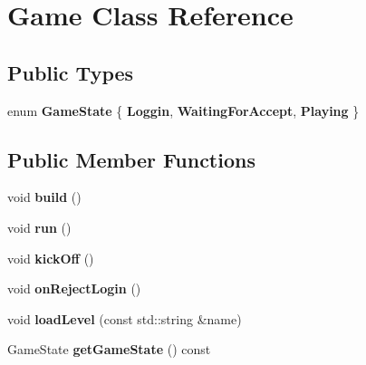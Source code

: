 \hypertarget{class_game}{\section{Game Class Reference}
\label{class_game}
}
\subsection*{Public Types}
\begin{DoxyCompactItemize}
\item 
enum {\bfseries Game\-State} \{ {\bfseries Loggin}, 
{\bfseries Waiting\-For\-Accept}, 
{\bfseries Playing}
 \}
\end{DoxyCompactItemize}
\subsection*{Public Member Functions}
\begin{DoxyCompactItemize}
\item 
\hypertarget{class_game_ab0f21e585b373e81baec2eb21679defe}{void {\bfseries build} ()}\label{class_game_ab0f21e585b373e81baec2eb21679defe}

\item 
\hypertarget{class_game_a1ab78f5ed0d5ea879157357cf2fb2afa}{void {\bfseries run} ()}\label{class_game_a1ab78f5ed0d5ea879157357cf2fb2afa}

\item 
\hypertarget{class_game_a92d26f09bb71012aa2dc3ec58e0656ef}{void {\bfseries kick\-Off} ()}\label{class_game_a92d26f09bb71012aa2dc3ec58e0656ef}

\item 
\hypertarget{class_game_a67a0885d0068caad4a306670120a64aa}{void {\bfseries on\-Reject\-Login} ()}\label{class_game_a67a0885d0068caad4a306670120a64aa}

\item 
\hypertarget{class_game_a9764aec80dddfe3be2842bbd05f1e5c7}{void {\bfseries load\-Level} (const std\-::string \&name)}\label{class_game_a9764aec80dddfe3be2842bbd05f1e5c7}

\item 
\hypertarget{class_game_ac9317693584f31dd51f12e0fa84a1233}{Game\-State {\bfseries get\-Game\-State} () const }\label{class_game_ac9317693584f31dd51f12e0fa84a1233}

\end{DoxyCompactItemize}

